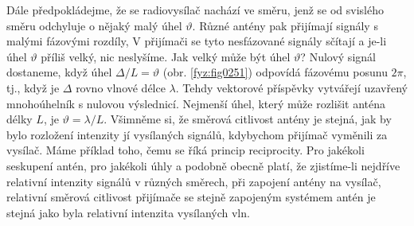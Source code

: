    Dále předpokládejme, že se radiovysílač nachází ve směru, jenž se od svislého směru odchyluje o 
    nějaký malý úhel \(\vartheta\). Různé antény pak přijímají signály s malými fázovými rozdíly, V 
    přijímači se tyto nesfázované signály sčítají a je-li úhel \(\vartheta\) příliš velký, nic 
    neslyšíme. Jak velký může být úhel \(\vartheta\)? Nulový signál dostaneme, když úhel \(\Delta/L 
    =\vartheta\) (obr. \ref{fyz:fig0251}) odpovídá fázovému posunu \(2\pi\), tj., když je \(\Delta\) 
    rovno vlnové délce \(\lambda\). Tehdy vektorové příspěvky vytvářejí uzavřený mnohoúhelník s 
    nulovou výslednicí. Nejmenší úhel, který může rozlišit anténa délky \(L\), je \(\vartheta = 
    \lambda/L\). Všimněme si, že směrová citlivost antény je stejná, jak by bylo rozložení 
    intenzity jí vysílaných signálů, kdybychom přijímač vyměnili za vysílač. Máme příklad toho, 
    čemu se říká princip reciprocity. Pro jakékoli seskupení antén, pro jakékoli úhly a podobně 
    obecně platí, že zjistíme-li nejdříve relativní intenzity signálů v různých směrech, při 
    zapojení antény na vysílač, relativní směrová citlivost přijímače se stejně zapojeným systémem 
    antén je stejná jako byla relativní intenzita vysílaných vln. 
    
